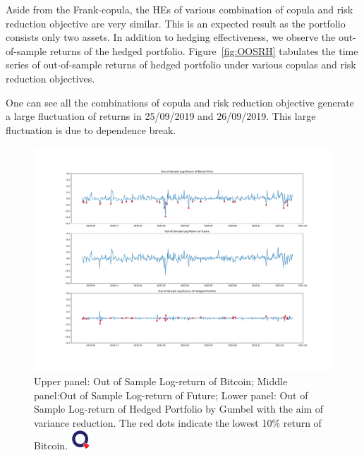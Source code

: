 Aside from the Frank-copula, the HEs of various combination of copula and risk reduction objective are very similar.
This is an expected result as the portfolio consists only two assets.
In addition to hedging effectiveness, we observe the out-of-sample returns of the hedged portfolio.
Figure~\ref{fig:OOSRH} tabulates the time series of out-of-sample returns of hedged portfolio under various copulas and risk reduction objectives.

One can see all the combinations of copula and risk reduction objective generate a large fluctuation of returns in
25/09/2019 and 26/09/2019.
This large fluctuation is due to dependence break.
\medskip

\begin{figure}[th]
   \centering
   \includegraphics[width=\textwidth]{_pics/OOSreturns_compare.pdf}
   \caption{Upper panel: Out of Sample Log-return of Bitcoin; Middle panel:Out of Sample Log-return of Future;
   Lower panel: Out of Sample Log-return of Hedged Portfolio by Gumbel with the aim of variance reduction.
   The red dots indicate the lowest 10\% return of Bitcoin.
   \href{http://www.quantlet.com/}{\includegraphics[width=20pt]{_pics/qletlogo_tr.png}}}
   \label{fig:Gumbel}
\end{figure}

